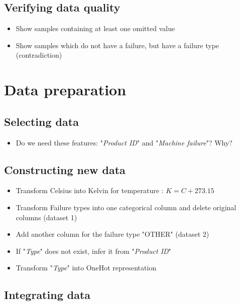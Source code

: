 \documentclass[11pt, a4paper]{article}
\begin{document}
\begin{multicols}{2}
	
\subsection{Verifying data quality}

\begin{itemize}
	\item Show samples containing at least one omitted value
	\item Show samples which do not have a failure, but have a failure type (contradiction)
\end{itemize}

\section{Data preparation}

\subsection{Selecting data}

\begin{itemize}
	\item Do we need these features: "\textit{Product ID}" and "\textit{Machine failure}"? Why?
\end{itemize}

\subsection{Constructing new data}

\begin{itemize}
	\item Transform Celsius into Kelvin for temperature : $ K = C + 273.15 $
	\item Transform Failure types into one categorical column and delete original columns (dataset 1)
	\item Add another column for the failure type "OTHER" (dataset 2)
	\item If "\textit{Type}" does not exist, infer it from "\textit{Product ID}"
	\item Transform "\textit{Type}" into OneHot representation
\end{itemize}

\subsection{Integrating data}


\end{multicols}
\end{document}
